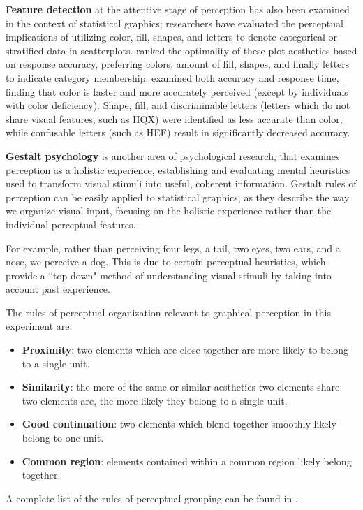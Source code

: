 \documentclass[12pt]{article}\usepackage[]{graphicx}\usepackage[]{color}
\begin{document}
{\bf Feature detection} at the attentive stage of perception has also been examined in the context of statistical graphics; researchers have evaluated the perceptual implications of utilizing color, fill, shapes, and letters to denote categorical or stratified data in scatterplots. \citet{cleveland:1984} ranked the optimality of these plot aesthetics based on response accuracy, preferring colors, amount of fill, shapes, and finally letters to indicate category membership. \citet{lewandowsky1989discriminating} examined both accuracy and response time, finding that color is faster and more accurately perceived (except by individuals with color deficiency). Shape, fill, and discriminable letters (letters which do not share visual features, such as HQX) were identified as less accurate than color, while confusable letters (such as HEF) result in significantly decreased accuracy. 

{\bf Gestalt psychology} is another area of psychological research, that examines perception as a holistic experience, establishing and evaluating mental heuristics used to transform visual stimuli into useful, coherent information. 
Gestalt rules of perception can be easily applied to statistical graphics, as they describe the way we organize visual input, focusing on the holistic experience rather than the individual perceptual features. 

For example, rather than perceiving four legs, a tail, two eyes, two ears, and a nose, we perceive a dog. This is due to certain perceptual heuristics, which provide a ``top-down" method of understanding visual stimuli by taking into account past experience. 

The rules of perceptual organization relevant to graphical perception in this experiment are:
\begin{itemize}
\item \textbf{Proximity}: two elements which are close together are more likely to belong to a single unit.
\item \textbf{Similarity}: the more of the same or similar aesthetics two elements share two elements are, the more likely they belong to a single unit. 
\item \textbf{Good continuation}: two elements which blend together smoothly likely belong to one unit.
\item \textbf{Common region}: elements contained within a common region likely belong together. 
\end{itemize}
A complete list of the rules of perceptual grouping can be found in \citet{goldstein2009encyclopedia}.
\end{document}
